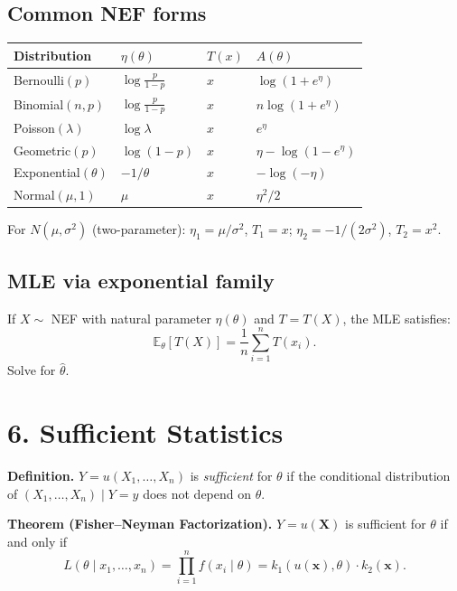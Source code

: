 \documentclass[11pt]{article}
\newcommand{\bbE}{\mathbb{E}}
\begin{document}
\subsection*{Common NEF forms}

\begin{tabular}{llll}
  \toprule
  Distribution & $\eta(\theta)$ & $T(x)$ & $A(\theta)$ \\
  \midrule
  Bernoulli$(p)$ & $\log\frac{p}{1-p}$ & $x$ & $\log(1+e^\eta)$ \\
  Binomial$(n,p)$ & $\log\frac{p}{1-p}$ & $x$ & $n\log(1+e^\eta)$ \\
  Poisson$(\lambda)$ & $\log\lambda$ & $x$ & $e^\eta$ \\
  Geometric$(p)$ & $\log(1-p)$ & $x$ & $\eta-\log(1-e^\eta)$\\
  Exponential$(\theta)$ & $-1/\theta$ & $x$ & $-\log(-\eta)$ \\
  Normal$(\mu,1)$ & $\mu$ & $x$ & $\eta^2/2$ \\
  \bottomrule
\end{tabular}

\medskip
\noindent For $N(\mu,\sigma^2)$ (two-parameter):
$\eta_1=\mu/\sigma^2$, $T_1=x$; $\eta_2=-1/(2\sigma^2)$, $T_2=x^2$.

\subsection*{MLE via exponential family}

If $X\sim$ NEF with natural parameter $\eta(\theta)$ and $T=T(X)$,
the MLE satisfies:
\[
  \bbE_\theta[T(X)] = \frac{1}{n}\sum_{i=1}^n T(x_i).
\]
Solve for $\hat\theta$.

\section*{6.\; Sufficient Statistics}

\textbf{Definition.} $Y=u(X_1,\ldots,X_n)$ is \emph{sufficient} for
$\theta$ if the conditional distribution of $(X_1,\ldots,X_n)\mid
Y=y$ does not depend on $\theta$.

\medskip
\textbf{Theorem (Fisher--Neyman Factorization).}
$Y=u(\mathbf{X})$ is sufficient for $\theta$ if and only if
\[
  L(\theta\mid x_1,\ldots,x_n)=\prod_{i=1}^n f(x_i\mid\theta) =
  k_1(u(\mathbf{x}),\theta)\cdot k_2(\mathbf{x}).
\]
\end{document}
